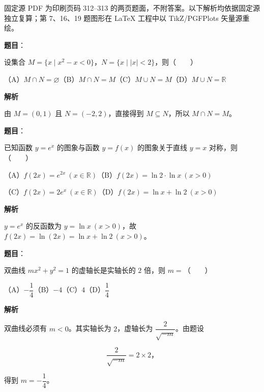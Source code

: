 

\begin{gktip}
固定源 PDF 为印刷页码 312–313 的两页题面，不附答案。以下解析均依据固定源独立复算；第 7、16、19 题图形在 LaTeX 工程中以 TikZ/PGFPlots 矢量源重绘。
\end{gktip}

\begin{answer}

\textbf{题目}：

设集合 $M=\{x\mid x^2-x<0\}$，$N=\{x\mid |x|<2\}$，则\mbox{（　　）}

（A）$M\cap N=\varnothing$\quad（B）$M\cap N=M$\quad（C）$M\cup N=M$\quad（D）$M\cup N=\mathbb R$

\textbf{解析}

由 $M=(0,1)$ 且 $N=(-2,2)$，直接得到 $M\subseteq N$，所以 $M\cap N=M$。


\end{answer}
\begin{answer}

\textbf{题目}：

已知函数 $y=e^x$ 的图象与函数 $y=f(x)$ 的图象关于直线 $y=x$ 对称，则\mbox{（　　）}

（A）$f(2x)=e^{2x}\ (x\in\mathbb R)$\quad（B）$f(2x)=\ln2\cdot\ln x\ (x>0)$

（C）$f(2x)=2e^x\ (x\in\mathbb R)$\quad（D）$f(2x)=\ln x+\ln2\ (x>0)$

\textbf{解析}

$y=e^x$ 的反函数为 $y=\ln x\ (x>0)$，故 $f(2x)=\ln(2x)=\ln x+\ln2\ (x>0)$。


\end{answer}
\begin{answer}

\textbf{题目}：

双曲线 $mx^2+y^2=1$ 的虚轴长是实轴长的 $2$ 倍，则 $m=$\mbox{（　　）}

（A）$-\dfrac14$\quad（B）$-4$\quad（C）$4$\quad（D）$\dfrac14$

\textbf{解析}

双曲线必须有 $m<0$。其实轴长为 $2$，虚轴长为 $\dfrac2{\sqrt{-m}}$。由题设

\nopagebreak[4]
\[
\frac2{\sqrt{-m}}=2\times2\text{，}
\]

得到 $m=-\dfrac14$。


\end{answer}
